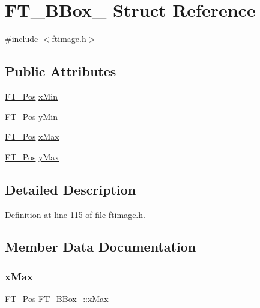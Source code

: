 \hypertarget{struct_f_t___b_box__}{}\section{F\+T\+\_\+\+B\+Box\+\_\+ Struct Reference}
\label{struct_f_t___b_box__}


{\ttfamily \#include $<$ftimage.\+h$>$}

\subsection*{Public Attributes}
\begin{DoxyCompactItemize}
\item 
\mbox{\hyperlink{ftimage_8h_af5f230f4b253d4c7715fd2e595614c90}{F\+T\+\_\+\+Pos}} \mbox{\hyperlink{struct_f_t___b_box___a1f2a5d0565d496c1d41e43d018f45add}{x\+Min}}
\item 
\mbox{\hyperlink{ftimage_8h_af5f230f4b253d4c7715fd2e595614c90}{F\+T\+\_\+\+Pos}} \mbox{\hyperlink{struct_f_t___b_box___a959ca1d5bc1c5338da0d85c8e7135f4e}{y\+Min}}
\item 
\mbox{\hyperlink{ftimage_8h_af5f230f4b253d4c7715fd2e595614c90}{F\+T\+\_\+\+Pos}} \mbox{\hyperlink{struct_f_t___b_box___ac6da5c44f4cb7b97eef1f438eb69c0ec}{x\+Max}}
\item 
\mbox{\hyperlink{ftimage_8h_af5f230f4b253d4c7715fd2e595614c90}{F\+T\+\_\+\+Pos}} \mbox{\hyperlink{struct_f_t___b_box___a77084921589f386a8a593ae1f25b1569}{y\+Max}}
\end{DoxyCompactItemize}


\subsection{Detailed Description}


Definition at line 115 of file ftimage.\+h.



\subsection{Member Data Documentation}
\mbox{\label{struct_f_t___b_box___ac6da5c44f4cb7b97eef1f438eb69c0ec}} 
\subsubsection{\texorpdfstring{xMax}{xMax}}
{\footnotesize\ttfamily \mbox{\hyperlink{ftimage_8h_af5f230f4b253d4c7715fd2e595614c90}{F\+T\+\_\+\+Pos}} F\+T\+\_\+\+B\+Box\+\_\+\+::x\+Max}



